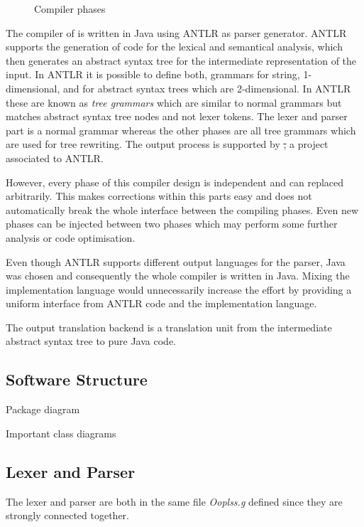 \begin{figure}[ht]
	\centerline{}
	\caption{Compiler phases}
	\label{fig:compilerPhase}
\end{figure}

The compiler of \ooplss is written in Java using
ANTLR as parser generator. ANTLR supports the generation of code for the lexical
and semantical analysis, which then generates an abstract syntax tree for
the intermediate representation of the input. In ANTLR it is possible to
define both, grammars for string, 1-dimensional, and for
abstract syntax trees which are 2-dimensional. In ANTLR these are known
as \emph{tree grammars} which are similar to normal grammars but matches
abstract syntax tree nodes and not lexer tokens. The lexer and parser
part is a normal grammar whereas the other phases are all tree grammars
which are used for tree rewriting.
The output process is supported by
\st, a project associated to ANTLR.

However, every phase of this compiler design is independent and can 
replaced arbitrarily. This makes corrections within this parts easy and
does not automatically break the whole interface between the compiling
phases. Even new phases can be injected between two phases which may 
perform some further analysis or code optimisation.

Even though ANTLR supports different output languages for the parser, Java was
chosen and consequently the whole compiler is written in Java. Mixing
the implementation language would unnecessarily increase the effort
by providing a uniform interface from ANTLR code and the implementation
language.

The output translation backend is a translation unit from the
intermediate abstract syntax tree to pure Java code.

\subsection{Software Structure}

Package diagram

Important class diagrams

\subsection{Lexer and Parser}
The lexer and parser are both in the same file \emph{Ooplss.g} defined
since they are strongly connected together. 

